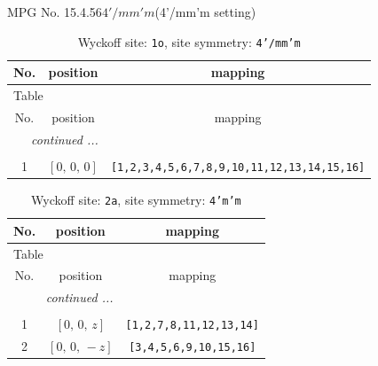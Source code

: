 \documentclass[fleqn,8pt]{jsarticle}
\begin{document}
\setcounter{MaxMatrixCols}{32}

\renewcommand{\tablename}{Table~}
\renewcommand{\figurename}{Figure~}
\begin{center}
\LARGE
MPG No. 15.4.56\quad$4'/mm'm$\quad(4'/mm'm setting)
\end{center}
\renewcommand{\arraystretch}{1.2}
\begin{longtable}{ccc}
\caption{Wyckoff site: {\tt 1o}, site symmetry: {\tt 4'/mm'm}}
 \\
 \hline \hline
No. & position & mapping \\ \hline \endfirsthead

\multicolumn{2}{l}{\tablename\ \thetable{}} \\
 \hline \hline
No. & position & mapping \\ \hline \endhead

 \hline \hline
\multicolumn{2}{r}{\footnotesize\it continued ...} \\ \endfoot

 \hline \hline
\multicolumn{2}{r}{} \\ \endlastfoot

1 & $\left[ 0,\, 0,\, 0 \right]$ & {\tt [1,2,3,4,5,6,7,8,9,10,11,12,13,14,15,16]} \\
\end{longtable}
\renewcommand{\arraystretch}{1.2}
\begin{longtable}{ccc}
\caption{Wyckoff site: {\tt 2a}, site symmetry: {\tt 4'm'm}}
 \\
 \hline \hline
No. & position & mapping \\ \hline \endfirsthead

\multicolumn{2}{l}{\tablename\ \thetable{}} \\
 \hline \hline
No. & position & mapping \\ \hline \endhead

 \hline \hline
\multicolumn{2}{r}{\footnotesize\it continued ...} \\ \endfoot

 \hline \hline
\multicolumn{2}{r}{} \\ \endlastfoot

1 & $\left[ 0,\, 0,\, z \right]$ & {\tt [1,2,7,8,11,12,13,14]} \\ \hline
2 & $\left[ 0,\, 0,\, - z \right]$ & {\tt [3,4,5,6,9,10,15,16]} \\
\end{longtable}
\renewcommand{\arraystretch}{1.2}
\end{document}

